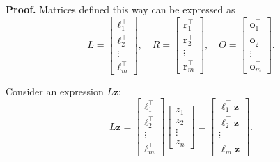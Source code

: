 \documentclass[../../book.tex]{subfiles}
\begin{document}
\textbf{Proof.} Matrices defined this way can be expressed as
\begin{equation*}
    L = \begin{bmatrix}
        \boldsymbol{\ell}_1^{\top} \\ \boldsymbol{\ell}_2^{\top} \\ \vdots \\ \boldsymbol{\ell}_m^{\top}
    \end{bmatrix}, \quad R = \begin{bmatrix}
        \boldsymbol{r}_1^{\top} \\ \boldsymbol{r}_2^{\top} \\ \vdots \\ \boldsymbol{r}_m^{\top}
    \end{bmatrix}, \quad O = \begin{bmatrix}
        \boldsymbol{o}_1^{\top} \\ \boldsymbol{o}_2^{\top} \\ \vdots \\ \boldsymbol{o}_m^{\top}
    \end{bmatrix}.
\end{equation*}

Consider an expression $L\mathbf{z}$:
\begin{equation*}
    L\mathbf{z} = \begin{bmatrix}
        \boldsymbol{\ell}_1^{\top} \\ \boldsymbol{\ell}_2^{\top} \\ \vdots \\ \boldsymbol{\ell}_m^{\top}
    \end{bmatrix}\begin{bmatrix}
        z_1 \\ z_2 \\ \vdots \\ z_n
    \end{bmatrix} = \begin{bmatrix}
        \boldsymbol{\ell}_1^{\top}\mathbf{z} \\ \boldsymbol{\ell}_2^{\top}\mathbf{z} \\ \vdots \\ \boldsymbol{\ell}_m^{\top}\mathbf{z}
    \end{bmatrix}.
\end{equation*}
\end{document}
